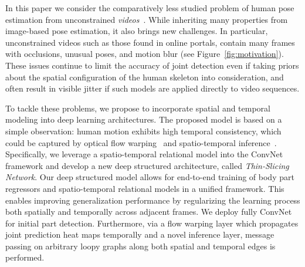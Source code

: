 \documentclass[10pt,twocolumn,letterpaper]{article}
\newcommand{\figref}[1]{Figure~\ref{#1}}
\begin{document}
In this paper we consider the comparatively less studied problem of human pose estimation from unconstrained \emph{videos}~\cite{gkioxari2016chained,pfister2015flowing,zhang2015human,zuffi2013estimating}. While inheriting many properties from image-based pose estimation, it also brings new challenges. In particular, unconstrained videos such as those found in online portals, contain many frames with occlusions, unusual poses, and motion blur (see \figref{fig:motivation}). These issues continue to limit the accuracy of joint detection even if taking priors about the spatial configuration of the human skeleton into consideration, and often result in visible jitter if such models are applied directly to video sequences.

To tackle these problems, we propose to incorporate spatial and temporal modeling into deep learning architectures.
The proposed model is based on a simple observation: human motion exhibits high temporal consistency, which could be captured by optical flow warping~\cite{pfister2015flowing,zhang2015human,zuffi2013estimating} and spatio-temporal inference~\cite{wang2014video,xiaohan2015joint}. Specifically, we leverage a spatio-temporal relational model into the ConvNet framework and develop a new deep structured architecture, called {\em Thin-Slicing Network}. 
Our deep structured model allows for end-to-end training of body part regressors and spatio-temporal relational models in a unified framework. This enables improving generalization performance by regularizing the learning process both spatially and temporally across adjacent frames.
We deploy fully ConvNet for initial part detection. Furthermore, via a flow warping layer which propagates joint prediction heat
maps temporally and a novel inference layer, message passing
on arbitrary loopy graphs along both spatial and temporal
edges is performed.
 

\end{document}
